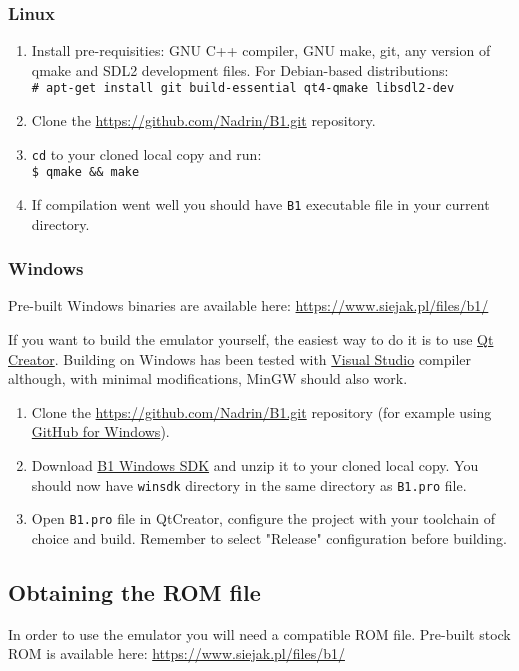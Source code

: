 \documentclass[a4paper,10pt,oneside]{article}
\begin{document}
\subsubsection*{Linux}
\begin{enumerate}
  \item Install pre-requisities: GNU C++ compiler, GNU make, git, any version of qmake and SDL2 development files. For Debian-based distributions: \\ \texttt{\# apt-get install git build-essential qt4-qmake libsdl2-dev}
  \item Clone the \url{https://github.com/Nadrin/B1.git} repository.
  \item \texttt{cd} to your cloned local copy and run: \\ \texttt{\$ qmake \&\& make}
  \item If compilation went well you should have \texttt{B1} executable file in your current directory.
\end{enumerate}

\subsubsection*{Windows}
Pre-built Windows binaries are available here: \url{https://www.siejak.pl/files/b1/}

If you want to build the emulator yourself, the easiest way to do it is to use \href{http://www.qt.io/download-open-source/}{Qt Creator}. Building on Windows has been tested with \href{http://www.visualstudio.com/en-us/products/visual-studio-community-vs.aspx}{Visual Studio} compiler although, with minimal modifications, MinGW should also work.

\begin{enumerate}
  \item Clone the \url{https://github.com/Nadrin/B1.git} repository (for example using \href{https://windows.github.com/}{GitHub for Windows}).
  \item Download \href{https://www.siejak.pl/files/b1/b1-winsdk.zip}{B1 Windows SDK} and unzip it to your cloned local copy. You should now have \texttt{winsdk} directory in the same directory as \texttt{B1.pro} file.
  \item Open \texttt{B1.pro} file in QtCreator, configure the project with your toolchain of choice and build. Remember to select "Release" configuration before building.
\end{enumerate}

\subsection{Obtaining the ROM file}
\label{sec:rom}
In order to use the emulator you will need a compatible ROM file. Pre-built stock ROM is available here: \url{https://www.siejak.pl/files/b1/}
\end{document}
